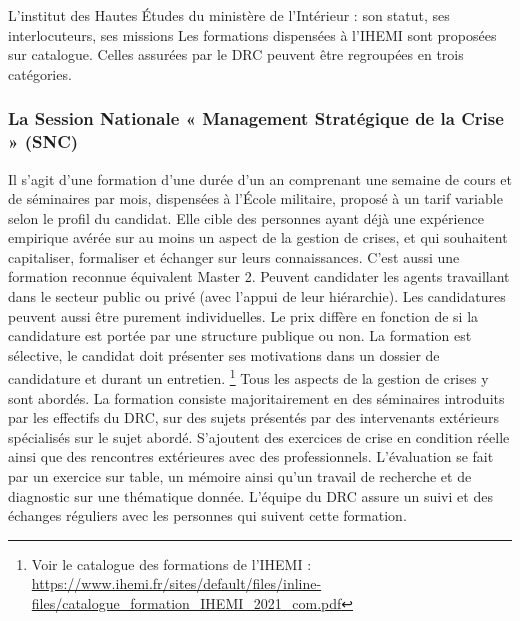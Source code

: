 \documentclass[10pt,a4paper]{report} %
\begin{document}
\begin{part}{L’institut des Hautes Études du ministère de l’Intérieur : son statut, ses interlocuteurs, ses missions}
Les formations dispensées à l’IHEMI sont proposées sur catalogue. Celles assurées par le DRC peuvent être regroupées en trois catégories.

\subsubsection{La Session Nationale « Management Stratégique de la Crise » (SNC)}
Il s’agit d’une formation d’une durée d’un an comprenant une semaine de cours et de séminaires par mois, dispensées à l’École militaire, proposé à un tarif variable selon le profil du candidat. Elle cible des personnes ayant déjà une expérience empirique avérée sur au moins un aspect de la gestion de crises, et qui souhaitent capitaliser, formaliser et échanger sur leurs connaissances. C’est aussi une formation reconnue équivalent Master 2. Peuvent candidater les agents travaillant dans le secteur public ou privé (avec l’appui de leur hiérarchie). Les candidatures peuvent aussi être purement individuelles. Le prix diffère en fonction de si la candidature est portée par une structure publique ou non. La formation est sélective, le candidat doit présenter ses motivations dans un dossier de candidature et durant un entretien. \footnote{Voir le catalogue des formations de l’IHEMI : \url{https://www.ihemi.fr/sites/default/files/inline-files/catalogue_formation_IHEMI_2021_com.pdf}}
Tous les aspects de la gestion de crises y sont abordés. La formation consiste majoritairement en des séminaires introduits par les effectifs du DRC, sur des sujets présentés par des intervenants extérieurs spécialisés sur le sujet abordé. S’ajoutent des exercices de crise en condition réelle ainsi que des rencontres extérieures avec des professionnels. L’évaluation se fait par un exercice sur table, un mémoire ainsi qu’un travail de recherche et de diagnostic sur une thématique donnée. L’équipe du DRC assure un suivi et des échanges réguliers avec les personnes qui suivent cette formation.


\end{part}
\end{document}
